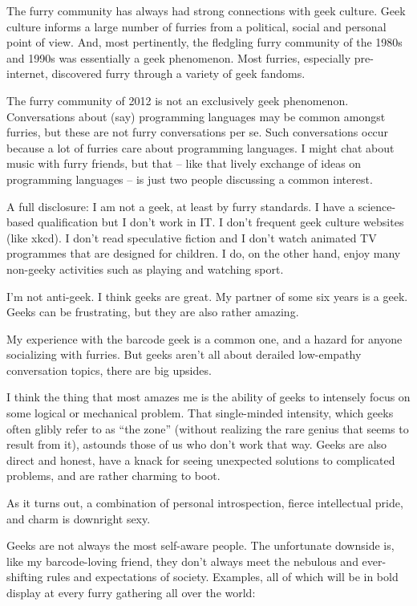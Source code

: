 The furry community has always had strong connections with geek culture. Geek culture informs a large number of furries from a political, social and personal point of view. And, most pertinently, the fledgling furry community of the 1980s and 1990s was essentially a geek phenomenon. Most furries, especially pre-internet, discovered furry through a variety of geek fandoms.

The furry community of 2012 is not an exclusively geek phenomenon. Conversations about (say) programming languages may be common amongst furries, but these are not furry conversations per se. Such conversations occur because a lot of furries care about programming languages. I might chat about music with furry friends, but that -- like that lively exchange of ideas on programming languages -- is just two people discussing a common interest.

A full disclosure: I am not a geek, at least by furry standards. I have a science-based qualification but I don't work in IT. I don't frequent geek culture websites (like xkcd). I don't read speculative fiction and I don't watch animated TV programmes that are designed for children. I do, on the other hand, enjoy many non-geeky activities such as playing and watching sport.

I'm not anti-geek. I think geeks are great. My partner of some six years is a geek. Geeks can be frustrating, but they are also rather amazing.

My experience with the barcode geek is a common one, and a hazard for anyone socializing with furries. But geeks aren't all about derailed low-empathy conversation topics, there are big upsides.

I think the thing that most amazes me is the ability of geeks to intensely focus on some logical or mechanical problem. That single-minded intensity, which geeks often glibly refer to as ``the zone'' (without realizing the rare genius that seems to result from it), astounds those of us who don't work that way. Geeks are also direct and honest, have a knack for seeing unexpected solutions to complicated problems, and are rather charming to boot.

As it turns out, a combination of personal introspection, fierce intellectual pride, and charm is downright sexy.

Geeks are not always the most self-aware people. The unfortunate downside is, like my barcode-loving friend, they don't always meet the nebulous and ever-shifting rules and expectations of society. Examples, all of which will be in bold display at every furry gathering all over the world:

